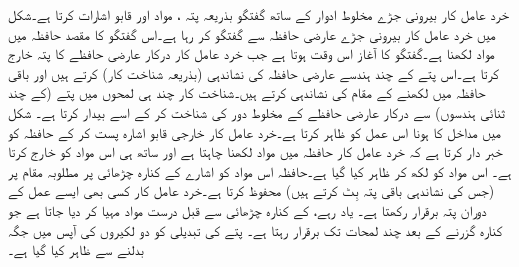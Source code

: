 خرد عامل کار بیرونی جڑے مخلوط ادوار کے ساتھ گفتگو بذریعہ پتہ ، مواد اور قابو اشارات  کرتا ہے۔شکل    میں خرد عامل کار بیرونی جڑے عارضی حافظہ سے گفتگو کر رہا ہے۔اس گفتگو کا مقصد حافظہ میں مواد لکھنا ہے۔گفتگو کا آغاز اس وقت ہوتا ہے جب خرد عامل کار درکار عارضی حافظے کا پتہ خارج کرتا ہے۔اس پتے کے  چند ہندسے عارضی حافظہ کی نشاندہی     (بذریعہ شناخت کار) کرتے ہیں اور باقی حافظہ میں لکھنے کے مقام کی نشاندہی کرتے ہیں۔شناخت کار چند ہی لمحوں میں پتے (کے چند ثنائی ہندسوں) سے درکار عارضی حافظے کے مخلوط دور کی شناخت کر کے اسے بیدار کرتا ہے۔ شکل میں   مداخل   کا     ہونا اس عمل کو ظاہر کرتا ہے۔خرد عامل کار خارجی قابو اشارہ  پست کر کے حافظہ کو خبر دار کرتا ہے کہ خرد عامل کار حافظہ میں مواد لکھنا چاہتا ہے اور ساتھ ہی   اس مواد کو خارج کرتا ہے۔ اس مواد کو  لکھ کر ظاہر کیا گیا ہے۔حافظہ اس مواد کو  اشارے کے کنارہ چڑھائی پر مطلوبہ مقام پر (جس کی نشاندہی باقی پتہ بِٹ کرتے ہیں) محفوظ کرتا ہے۔خرد عامل کار کسی بھی ایسے عمل کے دوران پتہ برقرار رکھتا ہے۔  یاد رہے،    کے کنارہ چڑھائی  سے قبل درست مواد  مہیا کر دیا جاتا ہے جو کنارہ گزرنے کے بعد چند لمحات تک برقرار رہتا ہے۔  پتے کی تبدیلی کو دو لکیروں کی آپس میں جگہ بدلنے سے ظاہر کیا گیا ہے۔

